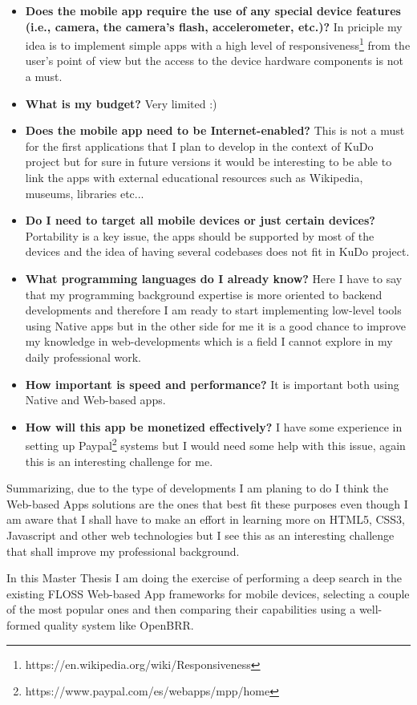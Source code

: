 \documentclass[a4paper,12pt]{book}
\begin{document}
\begin{itemize}
 \item \textbf{Does the mobile app require the use of any special device features (i.e., camera, the camera’s flash, accelerometer, etc.)?} In priciple my idea is to implement simple apps with a high level of responsiveness\footnote{https://en.wikipedia.org/wiki/Responsiveness}  from the user's point of view but the access to the device hardware components is not a must.
 \item \textbf{What is my budget?} Very limited :)
 \item \textbf{Does the mobile app need to be Internet-enabled?} This is not a must for the first applications that I plan to develop in the context of KuDo project but for sure in future versions it would be interesting to be able to link the apps with external educational resources such as Wikipedia, museums, libraries etc...
 \item \textbf{Do I need to target all mobile devices or just certain devices?} Portability is a key issue, the apps should be supported by most of the devices and the idea of having several codebases does not fit in KuDo project.
 \item \textbf{What programming languages do I already know?} Here I have to say that my programming background expertise is more oriented to backend developments and therefore I am ready to start implementing low-level tools using Native apps but in the other side for me it is a good chance to improve my knowledge in web-developments which is a field I cannot explore in my daily professional work.
 \item \textbf{How important is speed and performance?} It is important both using Native and Web-based apps.
 \item \textbf{How will this app be monetized effectively?} I have some experience in setting up Paypal\footnote{https://www.paypal.com/es/webapps/mpp/home}  systems but I would need some help with this issue, again this is an interesting challenge for me.
\end{itemize}

Summarizing, due to the type of developments I am planing to do I think the Web-based Apps solutions are the ones that best fit these purposes even though I am aware that I shall have to make an effort in learning more on HTML5, CSS3, Javascript and other web technologies but I see this as an interesting challenge that shall improve my professional background.

In this Master Thesis I am doing the exercise of performing a deep search in the existing FLOSS Web-based App frameworks for mobile devices, selecting a couple of the most popular ones and then comparing their capabilities using a well-formed quality system like OpenBRR.
\end{document}

